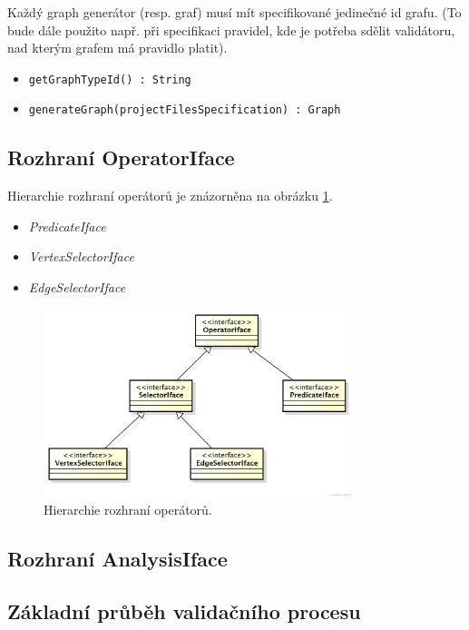 Každý graph generátor (resp. graf) musí mít specifikované jedinečné id grafu. (To bude dále použito např. při specifikaci pravidel, kde je potřeba sdělit validátoru, nad kterým grafem má pravidlo platit).

\begin{itemize}
\item \verb+getGraphTypeId() : String+
\item \verb+generateGraph(projectFilesSpecification) : Graph+
\end{itemize}

\subsection{Rozhraní OperatorIface}
Hierarchie rozhraní operátorů je znázorněna na obrázku \ref{design-operator_interfaces_hierarchy}.

\begin{itemize}
\item \emph{PredicateIface}
\item \emph{VertexSelectorIface}
\item \emph{EdgeSelectorIface}
\end{itemize}

\begin{figure}[h!]
  \centering
  \includegraphics[width=0.8\textwidth]{./uml/operator_interfaces.png}
  \caption{Hierarchie rozhraní operátorů.\label{design-operator_interfaces_hierarchy}}
\end{figure}

\subsection{Rozhraní AnalysisIface}

\subsection{Základní průběh validačního procesu}

